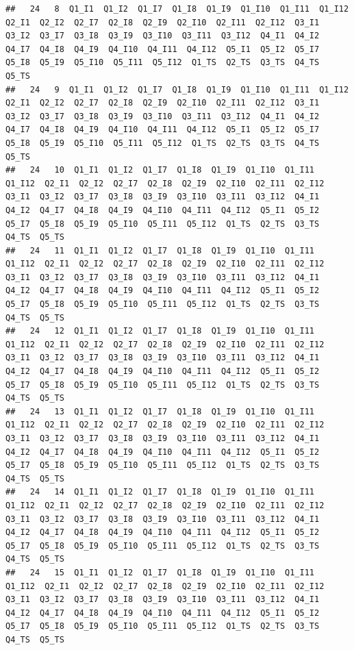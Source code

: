 \documentclass[
]{book}
\begin{document}
\begin{verbatim}
##   24   8  Q1_I1  Q1_I2  Q1_I7  Q1_I8  Q1_I9  Q1_I10  Q1_I11  Q1_I12  Q2_I1  Q2_I2  Q2_I7  Q2_I8  Q2_I9  Q2_I10  Q2_I11  Q2_I12  Q3_I1  Q3_I2  Q3_I7  Q3_I8  Q3_I9  Q3_I10  Q3_I11  Q3_I12  Q4_I1  Q4_I2  Q4_I7  Q4_I8  Q4_I9  Q4_I10  Q4_I11  Q4_I12  Q5_I1  Q5_I2  Q5_I7  Q5_I8  Q5_I9  Q5_I10  Q5_I11  Q5_I12  Q1_TS  Q2_TS  Q3_TS  Q4_TS  Q5_TS
##   24   9  Q1_I1  Q1_I2  Q1_I7  Q1_I8  Q1_I9  Q1_I10  Q1_I11  Q1_I12  Q2_I1  Q2_I2  Q2_I7  Q2_I8  Q2_I9  Q2_I10  Q2_I11  Q2_I12  Q3_I1  Q3_I2  Q3_I7  Q3_I8  Q3_I9  Q3_I10  Q3_I11  Q3_I12  Q4_I1  Q4_I2  Q4_I7  Q4_I8  Q4_I9  Q4_I10  Q4_I11  Q4_I12  Q5_I1  Q5_I2  Q5_I7  Q5_I8  Q5_I9  Q5_I10  Q5_I11  Q5_I12  Q1_TS  Q2_TS  Q3_TS  Q4_TS  Q5_TS
##   24   10  Q1_I1  Q1_I2  Q1_I7  Q1_I8  Q1_I9  Q1_I10  Q1_I11  Q1_I12  Q2_I1  Q2_I2  Q2_I7  Q2_I8  Q2_I9  Q2_I10  Q2_I11  Q2_I12  Q3_I1  Q3_I2  Q3_I7  Q3_I8  Q3_I9  Q3_I10  Q3_I11  Q3_I12  Q4_I1  Q4_I2  Q4_I7  Q4_I8  Q4_I9  Q4_I10  Q4_I11  Q4_I12  Q5_I1  Q5_I2  Q5_I7  Q5_I8  Q5_I9  Q5_I10  Q5_I11  Q5_I12  Q1_TS  Q2_TS  Q3_TS  Q4_TS  Q5_TS
##   24   11  Q1_I1  Q1_I2  Q1_I7  Q1_I8  Q1_I9  Q1_I10  Q1_I11  Q1_I12  Q2_I1  Q2_I2  Q2_I7  Q2_I8  Q2_I9  Q2_I10  Q2_I11  Q2_I12  Q3_I1  Q3_I2  Q3_I7  Q3_I8  Q3_I9  Q3_I10  Q3_I11  Q3_I12  Q4_I1  Q4_I2  Q4_I7  Q4_I8  Q4_I9  Q4_I10  Q4_I11  Q4_I12  Q5_I1  Q5_I2  Q5_I7  Q5_I8  Q5_I9  Q5_I10  Q5_I11  Q5_I12  Q1_TS  Q2_TS  Q3_TS  Q4_TS  Q5_TS
##   24   12  Q1_I1  Q1_I2  Q1_I7  Q1_I8  Q1_I9  Q1_I10  Q1_I11  Q1_I12  Q2_I1  Q2_I2  Q2_I7  Q2_I8  Q2_I9  Q2_I10  Q2_I11  Q2_I12  Q3_I1  Q3_I2  Q3_I7  Q3_I8  Q3_I9  Q3_I10  Q3_I11  Q3_I12  Q4_I1  Q4_I2  Q4_I7  Q4_I8  Q4_I9  Q4_I10  Q4_I11  Q4_I12  Q5_I1  Q5_I2  Q5_I7  Q5_I8  Q5_I9  Q5_I10  Q5_I11  Q5_I12  Q1_TS  Q2_TS  Q3_TS  Q4_TS  Q5_TS
##   24   13  Q1_I1  Q1_I2  Q1_I7  Q1_I8  Q1_I9  Q1_I10  Q1_I11  Q1_I12  Q2_I1  Q2_I2  Q2_I7  Q2_I8  Q2_I9  Q2_I10  Q2_I11  Q2_I12  Q3_I1  Q3_I2  Q3_I7  Q3_I8  Q3_I9  Q3_I10  Q3_I11  Q3_I12  Q4_I1  Q4_I2  Q4_I7  Q4_I8  Q4_I9  Q4_I10  Q4_I11  Q4_I12  Q5_I1  Q5_I2  Q5_I7  Q5_I8  Q5_I9  Q5_I10  Q5_I11  Q5_I12  Q1_TS  Q2_TS  Q3_TS  Q4_TS  Q5_TS
##   24   14  Q1_I1  Q1_I2  Q1_I7  Q1_I8  Q1_I9  Q1_I10  Q1_I11  Q1_I12  Q2_I1  Q2_I2  Q2_I7  Q2_I8  Q2_I9  Q2_I10  Q2_I11  Q2_I12  Q3_I1  Q3_I2  Q3_I7  Q3_I8  Q3_I9  Q3_I10  Q3_I11  Q3_I12  Q4_I1  Q4_I2  Q4_I7  Q4_I8  Q4_I9  Q4_I10  Q4_I11  Q4_I12  Q5_I1  Q5_I2  Q5_I7  Q5_I8  Q5_I9  Q5_I10  Q5_I11  Q5_I12  Q1_TS  Q2_TS  Q3_TS  Q4_TS  Q5_TS
##   24   15  Q1_I1  Q1_I2  Q1_I7  Q1_I8  Q1_I9  Q1_I10  Q1_I11  Q1_I12  Q2_I1  Q2_I2  Q2_I7  Q2_I8  Q2_I9  Q2_I10  Q2_I11  Q2_I12  Q3_I1  Q3_I2  Q3_I7  Q3_I8  Q3_I9  Q3_I10  Q3_I11  Q3_I12  Q4_I1  Q4_I2  Q4_I7  Q4_I8  Q4_I9  Q4_I10  Q4_I11  Q4_I12  Q5_I1  Q5_I2  Q5_I7  Q5_I8  Q5_I9  Q5_I10  Q5_I11  Q5_I12  Q1_TS  Q2_TS  Q3_TS  Q4_TS  Q5_TS

\end{verbatim}
\end{document}
